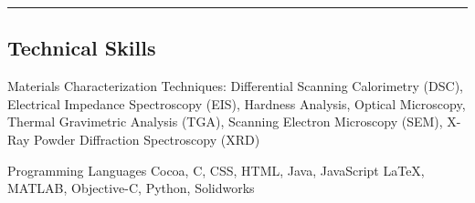 \documentclass[10pt,letterpaper]{article}
\newenvironment{indentsection}[1]%
{\begin{list}{}%
  {\setlength{\leftmargin}{#1}}%
  \item[]%
}
{\end{list}}
\newcommand{\CPP}
{C\nolinebreak[4]\hspace{-.05em}\raisebox{.22ex}{\footnotesize\bf ++}}
\begin{document}
\hrule
\vspace{-0.4em}
\subsection*{Technical Skills}

\begin{indentsection}{\parindent}
\begin{description*}
  \item[Materials Characterization Techniques:]
  Differential Scanning Calorimetry (DSC), Electrical Impedance Spectroscopy (EIS), Hardness Analysis, Optical Microscopy, Thermal Gravimetric Analysis (TGA), Scanning Electron Microscopy (SEM), X-Ray Powder Diffraction Spectroscopy (XRD)
  \item[Programming Languages]
  Cocoa, \CPP, CSS, HTML, Java, JavaScript \LaTeX, MATLAB, Objective-C, Python, Solidworks

\end{description*}
\end{indentsection}
\end{document}
